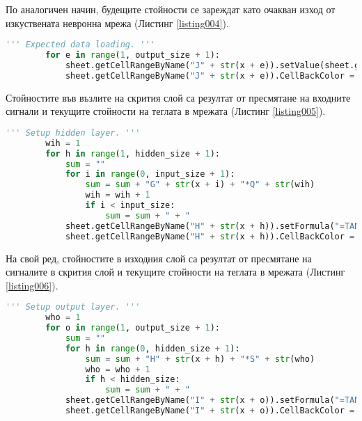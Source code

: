 По аналогичен начин, будещите стойности се зареждат като очакван изход от изкуствената невронна мрежа (Листинг \ref{listing004}).

\begin{lstlisting}[caption=Очакван изход от мрежата, language=Python, basicstyle=\tiny, label=listing004]
        ''' Expected data loading. '''
        for e in range(1, output_size + 1):
            sheet.getCellRangeByName("J" + str(x + e)).setValue(sheet.getCellRangeByName("E" + str(t + e + input_size)).getValue())
            sheet.getCellRangeByName("J" + str(x + e)).CellBackColor = (0 << 16 | 127 << 8 | 0)
\end{lstlisting}

Стойностите във възлите на скрития слой са резултат от пресмятане на входните сигнали и текущите стойности на теглата в мрежата (Листинг \ref{listing005}). 

\begin{lstlisting}[caption=Стойности на скрития слой при правия пас, language=Python, basicstyle=\tiny, label=listing005]
        ''' Setup hidden layer. '''
        wih = 1
        for h in range(1, hidden_size + 1):
            sum = ""
            for i in range(0, input_size + 1):
                sum = sum + "G" + str(x + i) + "*Q" + str(wih)
                wih = wih + 1
                if i < input_size:
                    sum = sum + " + "
            sheet.getCellRangeByName("H" + str(x + h)).setFormula("=TANH( " + sum + " )")
            sheet.getCellRangeByName("H" + str(x + h)).CellBackColor = (0 << 16 | 0 << 8 | 255)
\end{lstlisting}

На свой ред, стойностите в изходния слой са резултат от пресмятане на сигналите в скрития слой и текущите стойности на теглата в мрежата (Листинг \ref{listing006}).

\begin{lstlisting}[caption=Стойности на изходния слой при правия пас, language=Python, basicstyle=\tiny, label=listing006]
        ''' Setup output layer. '''
        who = 1
        for o in range(1, output_size + 1):
            sum = ""
            for h in range(0, hidden_size + 1):
                sum = sum + "H" + str(x + h) + "*S" + str(who)
                who = who + 1
                if h < hidden_size:
                    sum = sum + " + "
            sheet.getCellRangeByName("I" + str(x + o)).setFormula("=TANH( " + sum + " )")
            sheet.getCellRangeByName("I" + str(x + o)).CellBackColor = (0 << 16 | 255 << 8 | 0)
\end{lstlisting}


